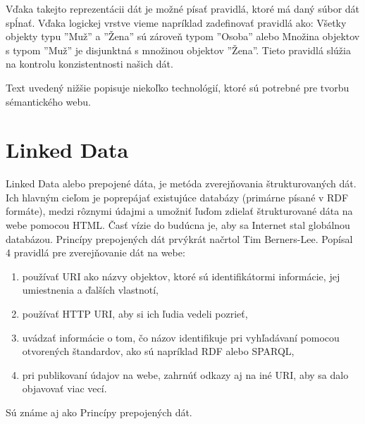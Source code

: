 \documentclass[12pt, a4paper, oneside]{book}
\begin{document}
Vďaka takejto reprezentácii dát je možné písať pravidlá, ktoré má daný súbor dát spĺnať. Vďaka logickej vrstve vieme napríklad zadefinovať pravidlá ako: Všetky objekty typu ''Muž'' a ''Žena'' sú zároveň typom ''Osoba'' alebo Množina objektov s typom ''Muž'' je disjunktná s množinou objektov ''Žena''. Tieto pravidlá slúžia na kontrolu konzistentnosti našich dát.





Text uvedený nižšie popisuje niekoľko technológií, ktoré sú potrebné pre tvorbu sémantického webu.

\section{Linked Data}



Linked Data \cite{linkeddata} alebo prepojené dáta, je metóda zverejňovania štrukturovaných dát. Ich hlavným cieľom je poprepájať existujúce databázy (primárne písané v RDF formáte), medzi rôznymi údajmi a umožniť ľuďom zdielať štrukturované dáta na webe pomocou HTML. Časť vízie do budúcna je, aby sa Internet stal globálnou databázou. Princípy prepojených dát prvýkrát načrtol Tim Berners-Lee. Popísal 4 pravidlá pre zverejňovanie dát na webe:
\begin{enumerate}
  \item používať URI ako názvy objektov, ktoré sú identifikátormi informácie, jej umiestnenia a ďalších vlastnotí,
  \item používať HTTP URI, aby si ich ľudia vedeli pozrieť,
  \item uvádzať informácie o tom, čo názov identifikuje pri vyhľadávaní pomocou otvorených štandardov, ako sú napríklad RDF alebo SPARQL,
  \item pri publikovaní údajov na webe, zahrnúť odkazy aj na iné URI, aby sa dalo objavovať viac vecí.
\end{enumerate}
Sú známe aj ako Princípy prepojených dát.
\end{document}
